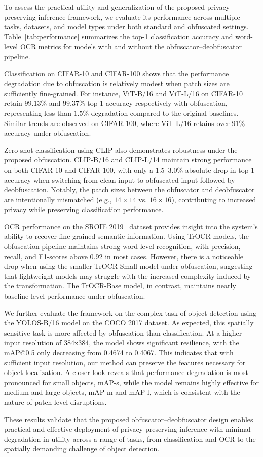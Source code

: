 \documentclass{ieeeaccess}
\begin{document}
To assess the practical utility and generalization of the proposed privacy-preserving inference framework, we evaluate its performance across multiple tasks, datasets, and model types under both standard and obfuscated settings. Table~\ref{tab:performance} summarizes the top-1 classification accuracy and word-level OCR metrics for models with and without the obfuscator–deobfuscator pipeline.

Classification on CIFAR-10 and CIFAR-100 shows that the performance degradation due to obfuscation is relatively modest when patch sizes are sufficiently fine-grained. For instance, ViT-B/16 and ViT-L/16 on CIFAR-10 retain $99.13\%$ and $99.37\%$ top-1 accuracy respectively with obfuscation, representing less than $1.5\%$ degradation compared to the original baselines. Similar trends are observed on CIFAR-100, where ViT-L/16 retains over $91\%$ accuracy under obfuscation.

Zero-shot classification using CLIP also demonstrates robustness under the proposed obfuscation. CLIP-B/16 and CLIP-L/14 maintain strong performance on both CIFAR-10 and CIFAR-100, with only a $1.5$–$3.0\%$ absolute drop in top-1 accuracy when switching from clean input to obfuscated input followed by deobfuscation. Notably, the patch sizes between the obfuscator and deobfuscator are intentionally mismatched (e.g., $14\times14$ vs. $16\times16$), contributing to increased privacy while preserving classification performance.

OCR performance on the SROIE 2019~\cite{Huang_2019} dataset provides insight into the system’s ability to recover fine-grained semantic information. Using TrOCR models, the obfuscation pipeline maintains strong word-level recognition, with precision, recall, and F1-scores above $0.92$ in most cases. However, there is a noticeable drop when using the smaller TrOCR-Small model under obfuscation, suggesting that lightweight models may struggle with the increased complexity induced by the transformation. The TrOCR-Base model, in contrast, maintains nearly baseline-level performance under obfuscation.

{We further evaluate the framework on the complex task of object detection using the YOLOS-B/16 model on the COCO 2017 dataset. As expected, this spatially sensitive task is more affected by obfuscation than classification. At a higher input resolution of 384x384, the model shows significant resilience, with the mAP@0.5 only decreasing from 0.4674 to 0.4067. This indicates that with sufficient input resolution, our method can preserve the features necessary for object localization. A closer look reveals that performance degradation is most pronounced for small objects, mAP-s, while the model remains highly effective for medium and large objects, mAP-m and mAP-l, which is consistent with the nature of patch-level disruptions.

These results validate that the proposed obfuscator–deobfuscator design enables practical and effective deployment of privacy-preserving inference with minimal degradation in utility across a range of tasks, from classification and OCR to the spatially demanding challenge of object detection.}
\end{document}
